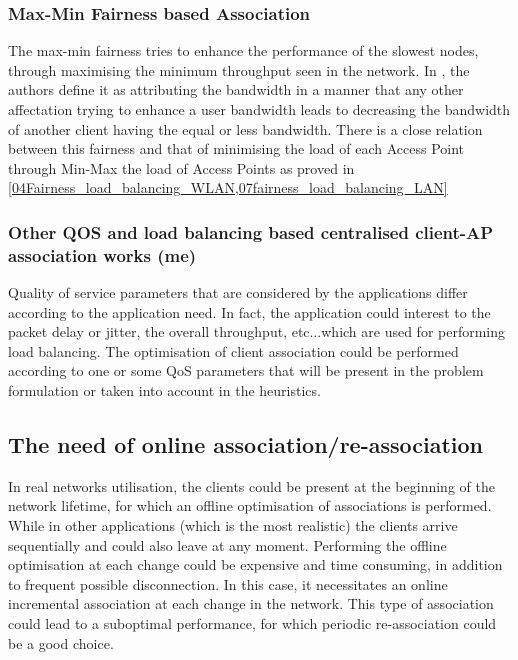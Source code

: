 \documentclass[journal,transmag]{IEEEtran}
\begin{document}
\subsubsection{Max-Min Fairness based Association}
The max-min fairness tries to enhance the performance of the slowest nodes, through maximising the minimum throughput seen in the network. In \cite{06proportional_fairness_3G_networks}, the authors define it as attributing the bandwidth in a manner that any other affectation trying to enhance a user bandwidth leads to decreasing the bandwidth of another client having the equal or less bandwidth. 
There is a close relation between this fairness and that of minimising the load of each Access Point through Min-Max the load of Access Points as proved in \ref{04Fairness_load_balancing_WLAN,07fairness_load_balancing_LAN}


\subsubsection{Other QOS and load balancing based centralised client-AP association works (me)}
Quality of service parameters that are considered by the applications differ according to the application need. In fact, the application could interest to the packet delay or jitter, the overall throughput, etc...which are used for performing load balancing. The optimisation of client association could be performed according to one or some QoS parameters that will be present in the problem formulation or taken into account in the heuristics.  

\subsection{The need of online association/re-association}

In real networks utilisation, the clients could be present at the beginning of the network lifetime, for which an offline optimisation of associations is performed. While in other applications (which is the most realistic) the clients arrive sequentially and could also leave at any moment. Performing the offline optimisation at each change could be expensive and time consuming, in addition to frequent possible disconnection. In this case, it necessitates an online incremental association at each change in the network. This type of association could lead to a suboptimal performance, for which periodic re-association could be a good choice. 
\end{document}
